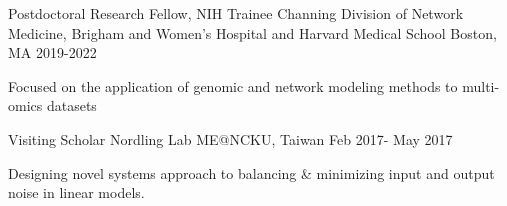 \begin{cventries}
  \cventry
    {Postdoctoral Research Fellow, NIH Trainee}
    {Channing Division of Network Medicine, Brigham and Women's Hospital and Harvard Medical School}
    {Boston, MA}
    {2019-2022}
    {
      \begin{cvitems}
        \item {Focused on the application of genomic and network modeling methods to multi-omics datasets}
      \end{cvitems}
    }
  \cventry
    {Visiting Scholar}
    {Nordling Lab}
    {ME@NCKU, Taiwan}
    {Feb 2017- May 2017}
    {
      \begin{cvitems}
        \item {Designing novel systems approach to balancing \& minimizing input and output noise in linear models.}
      \end{cvitems}
}


\end{cventries}
